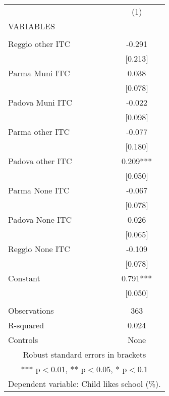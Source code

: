 \begin{tabular}{lc} \hline
 & (1) \\
VARIABLES &  \\ \hline
 &  \\
Reggio other ITC & -0.291 \\
 & [0.213] \\
Parma Muni ITC & 0.038 \\
 & [0.078] \\
Padova Muni ITC & -0.022 \\
 & [0.098] \\
Parma other ITC & -0.077 \\
 & [0.180] \\
Padova other ITC & 0.209*** \\
 & [0.050] \\
Parma None ITC & -0.067 \\
 & [0.078] \\
Padova None ITC & 0.026 \\
 & [0.065] \\
Reggio None ITC & -0.109 \\
 & [0.078] \\
Constant & 0.791*** \\
 & [0.050] \\
 &  \\
Observations & 363 \\
R-squared & 0.024 \\
 Controls & None \\ \hline
\multicolumn{2}{c}{ Robust standard errors in brackets} \\
\multicolumn{2}{c}{ *** p$<$0.01, ** p$<$0.05, * p$<$0.1} \\
\multicolumn{2}{c}{ Dependent variable: Child likes school (\%).} \\
\end{tabular}

